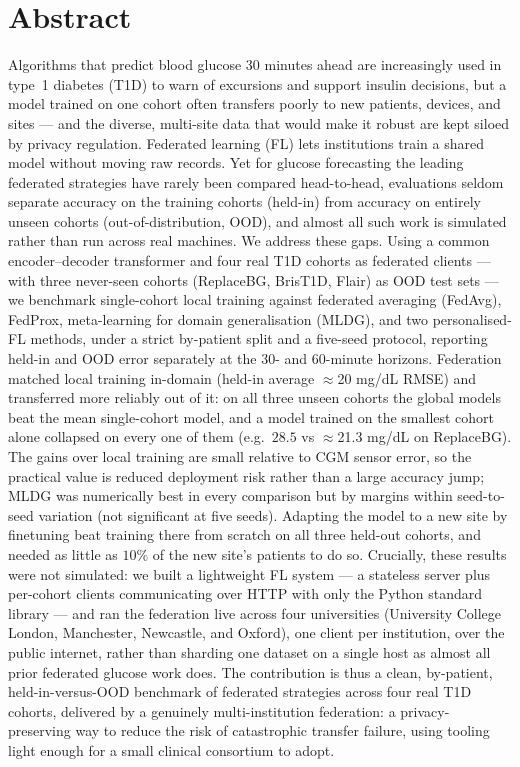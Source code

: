 \documentclass[10pt,letterpaper]{article}
\begin{document}
\section*{Abstract}
Algorithms that predict blood glucose 30 minutes ahead are increasingly used in
type~1 diabetes (T1D) to warn of excursions and support insulin decisions, but a
model trained on one cohort often transfers poorly to new patients, devices, and
sites --- and the diverse, multi-site data that would make it robust are kept
siloed by privacy regulation. Federated learning (FL) lets institutions train a
shared model without moving raw records. Yet for glucose forecasting the leading
federated strategies have rarely been compared head-to-head, evaluations seldom
separate accuracy on the training cohorts (held-in) from accuracy on entirely
unseen cohorts (out-of-distribution, OOD), and almost all such work is simulated
rather than run across real machines. We address these gaps. Using a common
encoder--decoder transformer and four real T1D cohorts as federated clients ---
with three never-seen cohorts (ReplaceBG, BrisT1D, Flair) as OOD test sets --- we
benchmark
single-cohort local training against federated averaging (FedAvg), FedProx,
meta-learning for domain generalisation (MLDG), and two personalised-FL methods,
under a strict by-patient split and a five-seed protocol, reporting held-in and
OOD error separately at the 30- and 60-minute horizons. Federation matched local
training
in-domain (held-in average $\approx$20 mg/dL RMSE) and transferred more reliably
out of it: on all three unseen cohorts the global models beat the mean
single-cohort model, and a model trained on the smallest
cohort alone collapsed on every one of them (e.g.\ $28.5$ vs $\approx$21.3 mg/dL
on ReplaceBG). The gains over local training are small relative to CGM sensor
error, so the practical value is reduced deployment risk rather than a large
accuracy jump; MLDG was numerically best in every comparison but by margins
within seed-to-seed variation (not significant at five seeds). Adapting the model
to a new site by finetuning beat training there from scratch on all three held-out
cohorts, and needed as little as $10\%$ of the new site's patients to do so. Crucially, these results
were not simulated: we built a lightweight FL system --- a stateless server plus
per-cohort clients communicating over HTTP with only the Python standard library
--- and ran the federation live across four universities (University College
London, Manchester, Newcastle, and Oxford), one client per institution, over the
public internet, rather than sharding one dataset on a single host as almost all
prior federated glucose work does. The contribution is thus a clean, by-patient,
held-in-versus-OOD benchmark of federated strategies across four real T1D cohorts,
delivered by a genuinely multi-institution federation: a privacy-preserving way to
reduce the risk of catastrophic transfer failure, using tooling light enough for a
small clinical consortium to adopt.
\end{document}
